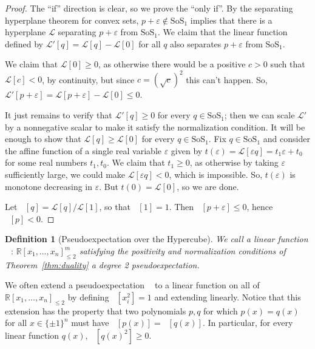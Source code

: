\documentclass[11pt]{article}
\newtheorem{definition}[theorem]{Definition}
\newcommand{\R}{\mathbb{R}} %
\renewcommand{\epsilon}{\varepsilon}
\newcommand{\eps}{\epsilon}
\newcommand{\cL}{\mathcal{L}}
\DeclareMathOperator{\pE}{\widetilde{\mathbb{E}}} %
\newcommand{\SoS}{\text{SoS}}
\begin{document}
\begin{proof}
  The ``if'' direction is clear, so we prove the ``only if''.
  By the separating hyperplane theorem for convex sets, $p + \eps \notin \SoS_1$ implies that there is a hyperplane $\cL$ separating $p + \eps$ from $\SoS_1$.
  We claim that the linear function defined by $\cL'[q] = \cL[q] - \cL[0]$ for all $q$ also separates $p+\eps$ from $\SoS_1$.

  We claim that $\cL[0] \geq 0$, as otherwise there would be a positive $c > 0$ such that $\cL[c] < 0$, by continuity, but since $c = (\sqrt c)^2$ this can't happen.
  So, $\cL'[p + \eps] = \cL[p + \eps] - \cL[0] \leq 0$.

  It just remains to verify that $\cL'[q] \geq 0$ for every $q \in \SoS_1$; then we can scale $\cL'$ by a nonnegative scalar to make it satisfy the normalization condition.
  It will be enough to show that $\cL[q] \geq \cL[0]$ for every $q \in \SoS_1$.
  Fix $q \in \SoS_1$ and consider the affine function of a single real variable $\epsilon$ given by $t(\epsilon) = \cL[\epsilon q] = t_1 \epsilon + t_0$ for some real numbers $t_1, t_0$.
  We claim that $t_1 \geq 0$, as otherwise by taking $\epsilon$ sufficiently large, we could make $\cL[\epsilon q] < 0$, which is impossible.
  So, $t(\epsilon)$ is monotone decreasing in $\epsilon$.
  But $t(0) = \cL[0]$, so we are done.

  Let $\pE[q] = \cL[q] / \cL[1]$, so that $\pE[1] = 1$. 
  Then $\pE[p+\eps] \leq 0$, hence $\pE[p] < 0$.
\end{proof}

\begin{definition}[Pseudoexpectation over the Hypercube]
  We call a linear function $\pE \, : \, \R[x_1,\ldots,x_n]_{\leq 2}^m$ satisfying the positivity and normalization conditions of Theorem~\ref{thm:duality} a \emph{degree 2 pseudoexpectation}.
\end{definition}

We often extend a pseudoexpectation $\pE$ to a linear function on all of $\R[x_1,\ldots,x_n]_{\leq 2}$ by defining $\pE[x_i^2] = 1$ and extending linearly.
Notice that this extension has the property that two polynomials $p,q$ for which $p(x) = q(x)$ for all $x \in \{\pm 1\}^n$ must have $\pE[p(x)] = \pE[q(x)]$.
In particular, for every linear function $q(x)$, $\pE[q(x)^2] \geq 0$.
\end{document}
